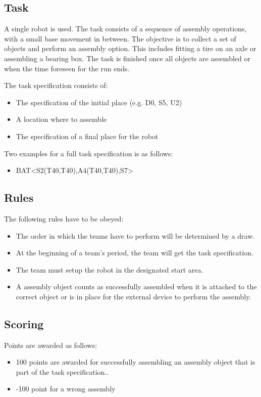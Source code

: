 \subsection{Task}
A single robot is used. The task consists of a sequence of assembly operations, with a small base movement in between. The objective is to collect a set of objects and perform an assembly option. This includes fitting a tire on an axle or assembling a bearing box. The task is finished once all objects are assembled or when the time foreseen for the run ends. 
\par
The task specification consists of: 
\begin{itemize}
	\item The specification of the initial place (e.g. D0, S5, U2)
	\item A location where to assemble
	\item The specification of a final place for the robot 
\end{itemize}

Two examples for a full task specification is as follows:
\begin{itemize}
	\item BAT\textless S2(T40,T40),A4(T40,T40),S7\textgreater  
\end{itemize}

\subsection{Rules}
The following rules have to be obeyed:

\begin{itemize}
\item The order in which the teams have to perform will be determined by a draw.
\item At the beginning of a team’s period, the team will get the task specification. 
\item The team must setup the robot in the designated start area.
\item A assembly object counts as successfully assembled when it is attached to the correct object or is in place for the external device to perform the assembly.
\end{itemize}


\subsection{Scoring}
Points are awarded as follows:

\begin{itemize}
\item 100 points are awarded for successfully assembling an assembly object that is part of the task specification..
\item -100 point for a wrong assembly
\end{itemize}

